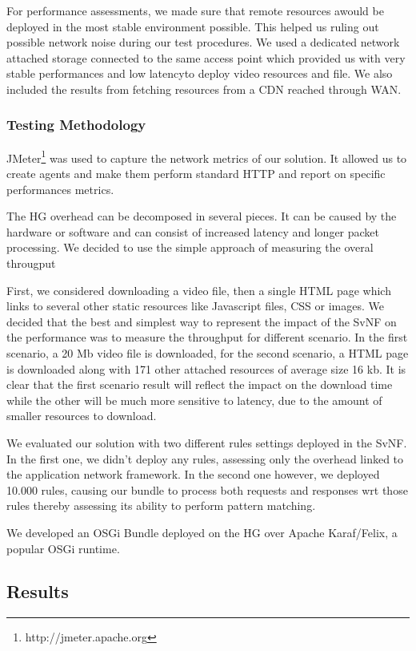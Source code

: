 For performance assessments, we made sure that remote resources awould be deployed in the most stable environment possible. This helped us ruling out possible network noise during our test procedures. We used a dedicated network attached storage connected to the same access point which provided us with very stable performances and low latencyto deploy video resources and file. We also included the results from fetching resources from a CDN reached through WAN.

 \subsubsection{Testing Methodology}
JMeter\footnote{http://jmeter.apache.org} was used to capture the network metrics of our solution.
It allowed us to create agents and make them perform standard HTTP and report on specific performances metrics.    

The HG overhead can be decomposed in several pieces.
It can be caused by the hardware or software and can consist of increased latency and longer packet processing.
We decided to use the simple approach of measuring the overal througput 

First, we considered downloading a video file, then a single HTML page which links to several other static resources like Javascript files, CSS or images. 
We decided that the best and simplest way to represent the impact of the SvNF on the performance was to measure the throughput for different scenario. In the first scenario, a 20 Mb video file is downloaded, for the second scenario, a HTML page is downloaded along with 171 other attached resources of average size 16 kb. It is clear that the first scenario result will reflect the impact on the download time while the other will be much more sensitive to latency, due to the amount of smaller resources to download.

We evaluated our solution with two different rules settings deployed in the SvNF. In the first one, we didn't deploy any rules, assessing only the overhead linked to the application network framework. In the second one however, we deployed 10.000 rules, causing our bundle to process both requests and responses wrt those rules thereby assessing its ability to perform pattern matching.

We developed an OSGi Bundle deployed on the HG over Apache Karaf/Felix, a popular OSGi runtime.

\subsection{Results}

